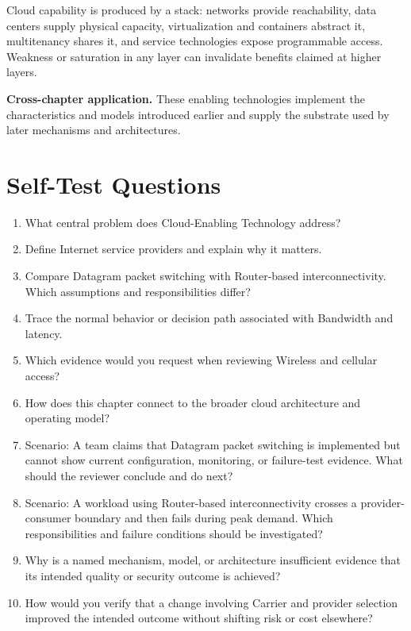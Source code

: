 \documentclass[11pt]{article}
\begin{document}
\begin{synthesisbox}
Cloud capability is produced by a stack: networks provide reachability, data centers supply physical capacity, virtualization and containers abstract it, multitenancy shares it, and service technologies expose programmable access. Weakness or saturation in any layer can invalidate benefits claimed at higher layers.
\par\smallskip
\textbf{Cross-chapter application.} These enabling technologies implement the characteristics and models introduced earlier and supply the substrate used by later mechanisms and architectures.
\end{synthesisbox}
\section{Self-Test Questions}
\begin{enumerate}
\item What central problem does Cloud-Enabling Technology address?
\item Define Internet service providers and explain why it matters.
\item Compare Datagram packet switching with Router-based interconnectivity. Which assumptions and responsibilities differ?
\item Trace the normal behavior or decision path associated with Bandwidth and latency.
\item Which evidence would you request when reviewing Wireless and cellular access?
\item How does this chapter connect to the broader cloud architecture and operating model?
\item Scenario: A team claims that Datagram packet switching is implemented but cannot show current configuration, monitoring, or failure-test evidence. What should the reviewer conclude and do next?
\item Scenario: A workload using Router-based interconnectivity crosses a provider-consumer boundary and then fails during peak demand. Which responsibilities and failure conditions should be investigated?
\item Why is a named mechanism, model, or architecture insufficient evidence that its intended quality or security outcome is achieved?
\item How would you verify that a change involving Carrier and provider selection improved the intended outcome without shifting risk or cost elsewhere?
\end{enumerate}
\clearpage
\end{document}
